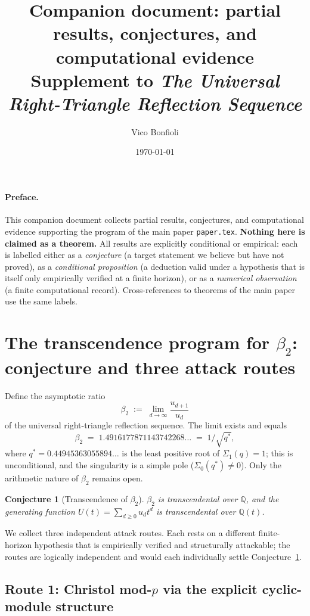 \documentclass[11pt,a4paper]{article}
\title{\textbf{Companion document: partial results, conjectures, and computational evidence}\\[0.3em]
\large Supplement to \emph{The Universal Right-Triangle Reflection Sequence}}
\author{Vico Bonfioli}
\date{\today}
\newtheorem{conjecture}{Conjecture}
\theoremstyle{remark}
\theoremstyle{plain}
\begin{document}
\maketitle

\paragraph{Preface.}
This companion document collects partial results, conjectures, and
computational evidence supporting the program of the main paper
\texttt{paper.tex}.  \textbf{Nothing here is claimed as a theorem.}
All results are explicitly conditional or empirical: each is labelled
either as a \emph{conjecture} (a target statement we believe but have
not proved), as a \emph{conditional proposition} (a deduction valid
under a hypothesis that is itself only empirically verified at a finite
horizon), or as a \emph{numerical observation} (a finite computational
record).  Cross-references to theorems of the main paper use the same
labels.

\section{The transcendence program for $\beta_2$: conjecture and three attack routes}
\label{sec:transcendence-program}

Define the asymptotic ratio
\[
\beta_2 \;:=\; \lim_{d \to \infty} \frac{u_{d+1}}{u_d}
\]
of the universal right-triangle reflection sequence.  The limit exists
and equals
\[
  \beta_2 \;=\; 1.4916177871143742268\ldots \;=\; 1/\sqrt{q^\ast},
\]
where $q^\ast = 0.44945363055894\ldots$ is the least positive root of
$\Sigma_1(q) = 1$; this is unconditional, and the singularity is a
simple pole ($\Sigma_0(q^\ast) \neq 0$).  Only the arithmetic nature of
$\beta_2$ remains open.

\begin{conjecture}[Transcendence of $\beta_2$]
\label{conj:beta2-transcendence}
$\beta_2$ is transcendental over $\mathbb{Q}$, and the generating
function $U(t) = \sum_{d \ge 0} u_d t^d$ is transcendental over
$\mathbb{Q}(t)$.
\end{conjecture}

We collect three independent attack routes.  Each rests on a different
finite-horizon hypothesis that is empirically verified and structurally
attackable; the routes are logically independent and would each
individually settle Conjecture~\ref{conj:beta2-transcendence}.

\subsection{Route 1: Christol mod-$p$ via the explicit cyclic-module structure}
\label{ssec:christol-route}
\end{document}
